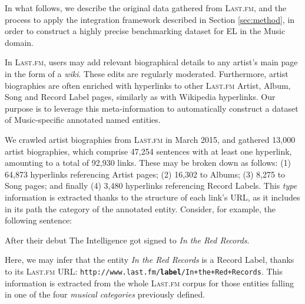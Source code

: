 In what follows, we describe the original data gathered from \textsc{Last.fm}, and the process to apply the integration framework described in Section \ref{sec:method}, in order to construct a highly precise benchmarking dataset for EL in the Music domain.


In \textsc{Last.fm}, users may add relevant biographical details to any artist's main page in the form of a \textit{wiki}. These edits are regularly moderated. Furthermore, artist biographies are often enriched with hyperlinks to other \textsc{Last.fm} Artist, Album, Song and Record Label pages, similarly as with Wikipedia hyperlinks. Our purpose is to leverage this meta-information to automatically construct a dataset of Music-specific annotated named entities.%

We crawled artist biographies from \textsc{Last.fm} in March 2015, and gathered 13,000 artist biographies, which comprise 47,254 sentences with at least one hyperlink, amounting to a total of 92,930 links. These may be broken down as follows: (1) 64,873 hyperlinks referencing Artist pages; (2) 16,302 to Albums; (3) 8,275 to Song pages; and finally (4) 3,480 hyperlinks referencing Record Labels. This \textit{type} information is extracted thanks to the structure of each link's URL, as it includes in its path the category of the annotated entity. Consider, for example, the following sentence:

\begin{adjustwidth}{2.5em}{20pt}
\begin{center}
After their debut The Intelligence got signed to \textit{In the Red Records}.\\
\end{center}
\end{adjustwidth}


Here, we may infer that the entity \textit{In the Red Records} is a Record Label, thanks to its \textsc{Last.fm} URL: {\footnotesize{\texttt{http://www.last.fm/{\normalsize\textbf{label}}/In+the+Red+Records}}}. This information is extracted from the whole \textsc{Last.fm} corpus for those entities falling in one of the four \textit{musical categories} previously defined.


